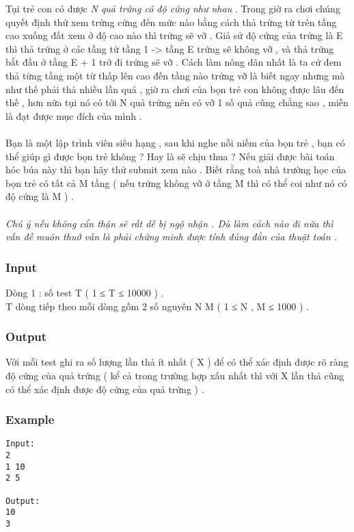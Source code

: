 



   Tụi trẻ con có được   \textit{    N quả trứng có độ cứng như nhau   }   . Trong giờ ra chơi chúng quyết định thử xem trứng cứng đến mức nào bằng cách thả trứng từ trên tầng cao xuống đất xem ở độ cao nào thì trứng sẽ vỡ . Giả sử độ cứng của trứng là E thì thả trứng ở các tầng từ tầng 1 -> tầng E trứng sẽ không vỡ , và thả trứng bắt đầu ở tầng E + 1 trở đi trứng sẽ vỡ . Cách làm nông dân nhất là ta cứ đem thả từng tầng một từ thấp lên cao đến tầng nào trứng vỡ là biết ngay nhưng mà như thế phải thả nhiều lần quá , giờ ra chơi của bọn trẻ con không được lâu đến thế , hơn nữa tụi nó có tới N quả trứng nên có vỡ 1 số quả cũng chẳng sao , miễn là đạt được mục đích của mình .   
\\
\\   Bạn là một lập trình viên siêu hạng , sau khi nghe nỗi niềm của bọn trẻ , bạn có thể giúp gì được bọn trẻ không ? Hay là sẽ chịu thua ? Nếu giải được bài toán hóc búa này thì bạn hãy thử submit xem nào . Biết rằng toà nhà trường học của bọn trẻ có tất cả M tầng  ( nếu trứng không vỡ ở tầng M thì có thể coi như nó có độ cứng là M ) .   
\\
\\\textit{         Chú ý nếu không cẩn thận sẽ rất dễ bị ngộ nhận . Dù làm cách nào đi nữa thì vấn đề muôn thuở vẫn là phải chứng minh được tính đúng đắn của thuật toán .       }

\subsubsection{   Input  }

   Dòng 1 : số test T ( 1 ≤ T ≤ 10000 ) .   
\\   T dòng tiếp theo mỗi dòng gồm 2 số nguyên N M ( 1 ≤ N , M ≤ 1000 ) .  

\subsubsection{   Output  }

   Với mỗi test ghi ra số lượng lần thả ít nhất ( X ) để có thể xác định được rõ ràng độ cứng của quả trứng ( kể cả trong trường hợp xấu nhất thì với X lần thả cũng có thể xác định được độ cứng của quả trứng ) .  

\subsubsection{   Example  }
\begin{verbatim}
Input:
2
1 10
2 5

Output:
10
3

\end{verbatim}
